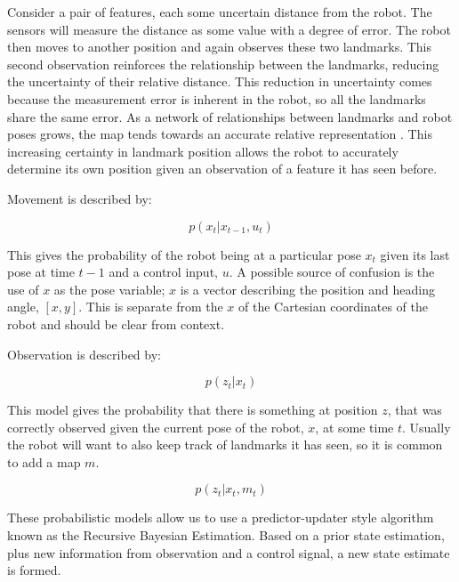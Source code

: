 \documentclass[12pt]{report}
\begin{document}
Consider a pair of features, each some uncertain distance from the robot.  The sensors will measure the distance as some value with a degree of error.  The robot then moves to another position and again observes these two landmarks.  This second observation reinforces the relationship between the landmarks, reducing the uncertainty of their relative distance.  This reduction in uncertainty comes because the measurement error is inherent in the robot, so all the landmarks share the same error.  As a network of relationships between landmarks and robot poses grows, the map tends towards an accurate relative representation \cite{durrant2006simultaneous}.  This increasing certainty in landmark position allows the robot to accurately determine its own position given an observation of a feature it has seen before.

Movement is described by:

\begin{equation}\label{predict_step}
p(x_{t}|x_{t-1},u_{t})
\end{equation}

This gives the probability of the robot being at a particular pose $x_{t}$ given its last pose at time $t-1$ and a control input, $u$.  A possible source of confusion is the use of $x$ as the pose variable;  $x$ is a vector describing the position and heading angle, $[x,y]$. This is separate from the $x$ of the Cartesian coordinates of the robot and should be clear from context.  

Observation is described by:

\begin{equation}\label{obs_stepA}
p(z_{t}|x_{t})
\end{equation}
   
This model gives the probability that there is something at position $z$, that was correctly observed given the current pose of the robot, $x$, at some time $t$.  Usually the robot will want to also keep track of landmarks it has seen, so it is common to add a map $m$.

\begin{equation}\label{obs_stepA}
p(z_{t}|x_{t}, m_t)
\end{equation}

These probabilistic models allow us to use a predictor-updater style algorithm known as the Recursive Bayesian Estimation.  Based on a prior state estimation, plus new information from observation and a control signal, a new state estimate is formed.
\end{document}
